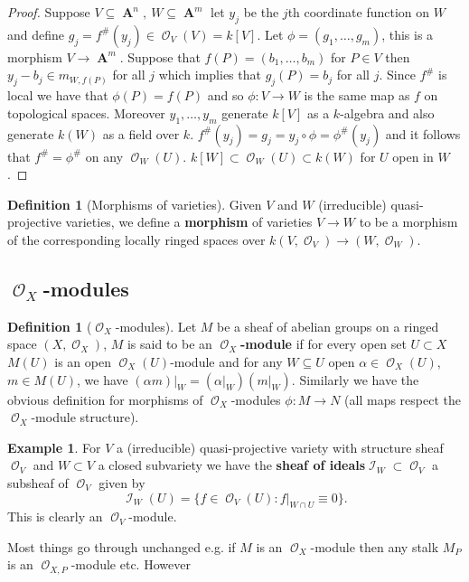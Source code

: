 \documentclass[10pt,]{book}
\newcommand{\terminology}[1]{\textbf{#1}}
\theoremstyle{plain}
\theoremstyle{definition}
\newtheorem{definition}[theorem]{Definition}
\newtheorem{example}[theorem]{Example}
\DeclareMathOperator{\bfA}{\mathbf{A}}
\DeclareMathOperator{\cI}{\mathcal{I}}
\DeclareMathOperator{\cO}{\mathcal{O}}
\begin{document}
\begin{proof}
Suppose \(V\subseteq \bfA^n,\ W\subseteq\bfA^m\) let \(y_j\) be the \(j\)th coordinate function on \(W\) and define \(g_j = f^\#(y_j) \in \cO_V(V) = k[V]\).
            Let \(\phi = (g_1,\ldots,g_m)\), this is a morphism \(V \to \bfA^m\).
            Suppose that \(f(P) = (b_1,\ldots,b_m)\) for \(P\in V\) then \(y_j - b_j \in m_{W,f(P)}\) for all \(j\) which implies that \(g_j(P) = b_j\) for all \(j\).
            Since \(f^\#\) is local we have that \(\phi(P) = f(P)\) and so \(\phi \colon V \to W\) is the same map as \(f\) on topological spaces.
            Moreover \(y_1,\ldots,y_m\) generate \(k[V]\) as a \(k\)-algebra and also generate \(k(W)\) as a field over \(k\). \(f^\#(y_j) = g_j = y_j\circ\phi = \phi^\#(y_j)\) and it follows that \(f^\# = \phi^\#\) on any \(\cO_W(U)\).
            \(k[W] \subset \cO_W(U)\subset k(W)\) for \(U\) open in \(W\).
          \end{proof}
\begin{definition}[Morphisms of varieties]\label{definition-13}
Given \(V\) and \(W\) (irreducible) quasi-projective varieties, we define a \terminology{morphism} of varieties \(V \to W\) to be a morphism of the corresponding locally ringed spaces over \(k\)\((V,\cO_V)\to (W,\cO_W)\).\end{definition}
\typeout{************************************************}
\typeout{Subsection 1.2.1 \(\cO_X\)-modules}
\typeout{************************************************}
\subsection[\(\cO_X\)-modules]{\(\cO_X\)-modules}\label{subsection-1}
\begin{definition}[\(\cO_X\)-modules]\label{definition-14}
Let \(M\) be a sheaf of abelian groups on a ringed space \((X,\cO_X)\), \(M\) is said to be an \terminology{\(\cO_X\)-module} if for every open set \(U\subset X\)\(M(U)\) is an open \(\cO_X(U)\)-module and for any \(W\subseteq U\) open \(\alpha \in \cO_X(U)\), \(m\in M(U)\), we have \((\alpha m)|_W = (\alpha|_W)(m|_W)\).
              Similarly we have the obvious definition for morphisms of \(\cO_X\)-modules \(\phi\colon M \to N\) (all maps respect the \(\cO_X\)-module structure).
            \end{definition}
\begin{example}\label{example-10}
For \(V\) a (irreducible) quasi-projective variety with structure sheaf \(\cO_V\) and \(W \subset V\) a closed subvariety we have the \terminology{sheaf of ideals}\(\cI_W \subset \cO_V\) a subsheaf of \(\cO_V\) given by \[\cI_W(U) = \{f\in \cO_V(U) : f|_{W\cap U} \equiv 0\}.\]
              This is clearly an \(\cO_V\)-module.
            \end{example}
Most things go through unchanged e.g. if \(M\) is an \(\cO_X\)-module then any stalk \(M_P\) is an \(\cO_{X,P}\)-module etc.\newline{}
            However 
%
\backmatter
%
\end{document}
